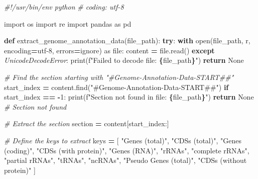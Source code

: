 \documentclass[
]{book}
\newenvironment{Shaded}{\begin{snugshade}}{\end{snugshade}}
\newcommand{\BuiltInTok}[1]{#1}
\newcommand{\CommentTok}[1]{\textcolor[rgb]{0.56,0.35,0.01}{\textit{#1}}}
\newcommand{\ControlFlowTok}[1]{\textcolor[rgb]{0.13,0.29,0.53}{\textbf{#1}}}
\newcommand{\DecValTok}[1]{\textcolor[rgb]{0.00,0.00,0.81}{#1}}
\newcommand{\ImportTok}[1]{#1}
\newcommand{\KeywordTok}[1]{\textcolor[rgb]{0.13,0.29,0.53}{\textbf{#1}}}
\newcommand{\NormalTok}[1]{#1}
\newcommand{\OperatorTok}[1]{\textcolor[rgb]{0.81,0.36,0.00}{\textbf{#1}}}
\newcommand{\PreprocessorTok}[1]{\textcolor[rgb]{0.56,0.35,0.01}{\textit{#1}}}
\newcommand{\SpecialCharTok}[1]{\textcolor[rgb]{0.81,0.36,0.00}{\textbf{#1}}}
\newcommand{\SpecialStringTok}[1]{\textcolor[rgb]{0.31,0.60,0.02}{#1}}
\newcommand{\StringTok}[1]{\textcolor[rgb]{0.31,0.60,0.02}{#1}}
\newcommand{\VariableTok}[1]{\textcolor[rgb]{0.00,0.00,0.00}{#1}}
\begin{document}
\begin{Shaded}
\begin{Highlighting}[]
\CommentTok{\#!/usr/bin/env python}
\CommentTok{\# coding: utf{-}8}

\ImportTok{import}\NormalTok{ os}
\ImportTok{import}\NormalTok{ re}
\ImportTok{import}\NormalTok{ pandas }\ImportTok{as}\NormalTok{ pd}

\KeywordTok{def}\NormalTok{ extract\_genome\_annotation\_data(file\_path):}
    \ControlFlowTok{try}\NormalTok{:}
        \ControlFlowTok{with} \BuiltInTok{open}\NormalTok{(file\_path, }\StringTok{\textquotesingle{}r\textquotesingle{}}\NormalTok{, encoding}\OperatorTok{=}\StringTok{\textquotesingle{}utf{-}8\textquotesingle{}}\NormalTok{, errors}\OperatorTok{=}\StringTok{\textquotesingle{}ignore\textquotesingle{}}\NormalTok{) }\ImportTok{as} \BuiltInTok{file}\NormalTok{:}
\NormalTok{            content }\OperatorTok{=} \BuiltInTok{file}\NormalTok{.read()}
    \ControlFlowTok{except} \PreprocessorTok{UnicodeDecodeError}\NormalTok{:}
        \BuiltInTok{print}\NormalTok{(}\SpecialStringTok{f"Failed to decode file: }\SpecialCharTok{\{}\NormalTok{file\_path}\SpecialCharTok{\}}\SpecialStringTok{"}\NormalTok{)}
        \ControlFlowTok{return} \VariableTok{None}
    
    \CommentTok{\# Find the section starting with "\#Genome{-}Annotation{-}Data{-}START\#\#"}
\NormalTok{    start\_index }\OperatorTok{=}\NormalTok{ content.find(}\StringTok{"\#Genome{-}Annotation{-}Data{-}START\#\#"}\NormalTok{)}
    \ControlFlowTok{if}\NormalTok{ start\_index }\OperatorTok{==} \OperatorTok{{-}}\DecValTok{1}\NormalTok{:}
        \BuiltInTok{print}\NormalTok{(}\SpecialStringTok{f"Section not found in file: }\SpecialCharTok{\{}\NormalTok{file\_path}\SpecialCharTok{\}}\SpecialStringTok{"}\NormalTok{)}
        \ControlFlowTok{return} \VariableTok{None}  \CommentTok{\# Section not found}
    
    \CommentTok{\# Extract the section}
\NormalTok{    section }\OperatorTok{=}\NormalTok{ content[start\_index:]}
    
    \CommentTok{\# Define the keys to extract}
\NormalTok{    keys }\OperatorTok{=}\NormalTok{ [}
        \StringTok{"Genes (total)"}\NormalTok{, }\StringTok{"CDSs (total)"}\NormalTok{, }\StringTok{"Genes (coding)"}\NormalTok{, }
        \StringTok{"CDSs (with protein)"}\NormalTok{, }\StringTok{"Genes (RNA)"}\NormalTok{, }\StringTok{"rRNAs"}\NormalTok{, }
        \StringTok{"complete rRNAs"}\NormalTok{, }\StringTok{"partial rRNAs"}\NormalTok{, }\StringTok{"tRNAs"}\NormalTok{, }
        \StringTok{"ncRNAs"}\NormalTok{, }\StringTok{"Pseudo Genes (total)"}\NormalTok{, }\StringTok{"CDSs (without protein)"}
\NormalTok{    ]}
    

\end{Highlighting}
\end{Shaded}
\end{document}
